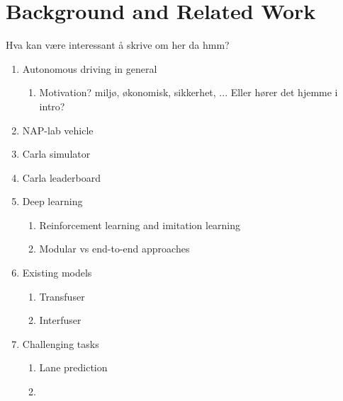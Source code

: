 \chapter{Background and Related Work}
\label{chap:background}

Hva kan være interessant å skrive om her da hmm?

\begin{enumerate}
    \item Autonomous driving in general
    \begin{enumerate}
        \item Motivation? miljø, økonomisk, sikkerhet, ... Eller hører det hjemme i intro?
    \end{enumerate}
    
    \item NAP-lab vehicle
    
    \item Carla simulator
    \item Carla leaderboard
    
    \item Deep learning
    \begin{enumerate}
        \item Reinforcement learning and imitation learning
        \item Modular vs end-to-end approaches
    \end{enumerate}
    
    \item Existing models
    \begin{enumerate}
        \item Transfuser
        \item Interfuser
    \end{enumerate}
    
    \item Challenging tasks
    \begin{enumerate}
        \item Lane prediction
        \item
    \end{enumerate}
\end{enumerate}

